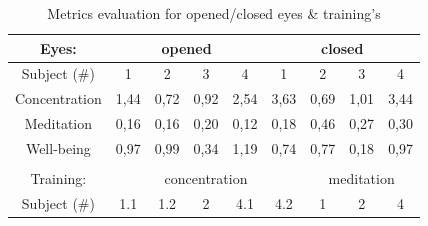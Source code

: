 \documentclass[9pt,twocolumn,twoside]{osajnl}
\begin{document}
\begin{table}[htbp]
\centering
\caption{Metrics evaluation for opened/closed eyes & training's}
\label{tab:my-table}
\begin{tabular}{|ccccccccc|}
\hline
\multicolumn{1}{|c|}{Eyes:}         & \multicolumn{4}{c|}{opened}                                                                                   & \multicolumn{4}{c|}{closed}                                                                                   \\ \hline
\multicolumn{1}{|c|}{Subject (\#)}  & \multicolumn{1}{c|}{1}    & \multicolumn{1}{c|}{2}    & \multicolumn{1}{c|}{3}    & \multicolumn{1}{c|}{4}    & \multicolumn{1}{c|}{1}    & \multicolumn{1}{c|}{2}    & \multicolumn{1}{c|}{3}    & 4                         \\ \hline
\multicolumn{1}{|c|}{Concentration} & \multicolumn{1}{c|}{1,44} & \multicolumn{1}{c|}{0,72} & \multicolumn{1}{c|}{0,92} & \multicolumn{1}{c|}{2,54} & \multicolumn{1}{c|}{3,63} & \multicolumn{1}{c|}{0,69} & \multicolumn{1}{c|}{1,01} & 3,44                      \\ \hline
\multicolumn{1}{|c|}{Meditation}    & \multicolumn{1}{c|}{0,16} & \multicolumn{1}{c|}{0,16} & \multicolumn{1}{c|}{0,20} & \multicolumn{1}{c|}{0,12} & \multicolumn{1}{c|}{0,18} & \multicolumn{1}{c|}{0,46} & \multicolumn{1}{c|}{0,27} & 0,30                      \\ \hline
\multicolumn{1}{|c|}{Well-being}    & \multicolumn{1}{c|}{0,97} & \multicolumn{1}{c|}{0,99} & \multicolumn{1}{c|}{0,34} & \multicolumn{1}{c|}{1,19} & \multicolumn{1}{c|}{0,74} & \multicolumn{1}{c|}{0,77} & \multicolumn{1}{c|}{0,18} & 0,97                      \\ \hline
\multicolumn{9}{|l|}{}                                                                                                                                                                                                                                              \\ \hline
\multicolumn{1}{|c|}{Training:}     & \multicolumn{5}{c|}{concentration}                                                                                                        & \multicolumn{3}{c|}{meditation}                                                   \\ \hline
\multicolumn{1}{|c|}{Subject (\#)}  & \multicolumn{1}{c|}{1.1}  & \multicolumn{1}{c|}{1.2}  & \multicolumn{1}{c|}{2}    & \multicolumn{1}{c|}{4.1}  & \multicolumn{1}{c|}{4.2}  & \multicolumn{1}{c|}{1}    & \multicolumn{1}{c|}{2}    & 4                         \\ \hline

\end{tabular}
\end{table}
\end{document}
